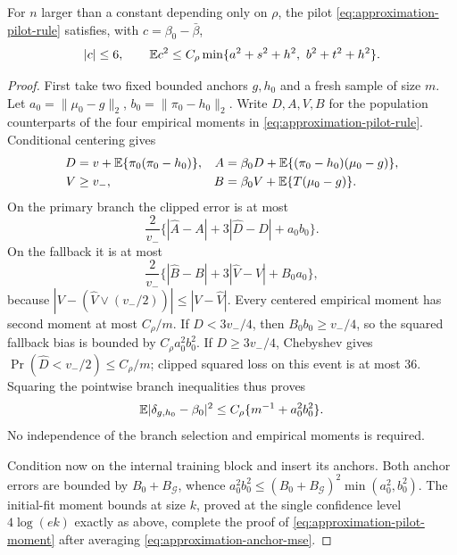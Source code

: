 \begin{lemma}
\label{lem:approx-adapt-pilot}
For $n$ larger than a constant depending only on $\rho$, the pilot
\eqref{eq:approximation-pilot-rule} satisfies, with
$c=\beta_0-\bar\beta$,
\begin{equation}
 |c|\le6,\qquad
 \mathbb E c^2\le C_\rho
 \min\{a^2+s^2+h^2,\ b^2+t^2+h^2\}.
 \label{eq:approximation-pilot-moment}
\end{equation}
\end{lemma}
\begin{proof}
First take two fixed bounded anchors $g,h_0$ and a fresh sample of
size $m$. Let $a_0=\|\mu_0-g\|_2$, $b_0=\|\pi_0-h_0\|_2$.
Write $D,A,V,B$ for the population counterparts of the four empirical
moments in \eqref{eq:approximation-pilot-rule}. Conditional centering
gives
\[
 \begin{aligned}
 D&=v+\mathbb E\{\pi_0(\pi_0-h_0)\},&
 A&=\beta_0D+\mathbb E\{(\pi_0-h_0)(\mu_0-g)\},\\
 V&\ge v_-,& B&=\beta_0V+\mathbb E\{T(\mu_0-g)\}.
 \end{aligned}
\]
On the primary branch the clipped error is at most
\[
 \frac2{v_-}\{ |\widehat A-A|+3|\widehat D-D|+a_0b_0\}.
\]
On the fallback it is at most
\[
 \frac2{v_-}\{ |\widehat B-B|+3|\widehat V-V|+B_0a_0\},
\]
because $|V-(\widehat V\vee(v_-/2))|\le|V-\widehat V|$.
Every centered empirical moment has second moment at most $C_\rho/m$.
If $D<3v_-/4$, then $B_0b_0\ge v_-/4$, so the squared fallback
bias is bounded by $C_\rho a_0^2b_0^2$. If $D\ge3v_-/4$,
Chebyshev gives
$\Pr(\widehat D<v_-/2)\le C_\rho/m$; clipped squared loss on this
event is at most 36. Squaring the pointwise branch inequalities thus
proves
\begin{equation}
 \mathbb E|\delta_{g,h_0}-\beta_0|^2
 \le C_\rho\{m^{-1}+a_0^2b_0^2\}.
 \label{eq:approximation-anchor-mse}
\end{equation}
No independence of the branch selection and empirical moments is
required.

Condition now on the internal training block and insert its anchors.
Both anchor errors are bounded by $B_0+B_{\mathcal G}$, whence
$a_0^2b_0^2\le (B_0+B_{\mathcal G})^2\min(a_0^2,b_0^2)$.
The initial-fit moment bounds at size $k$, proved at the single
confidence level $4\log(ek)$ exactly as above, complete the proof of
\eqref{eq:approximation-pilot-moment} after averaging
\eqref{eq:approximation-anchor-mse}.


\end{proof}
